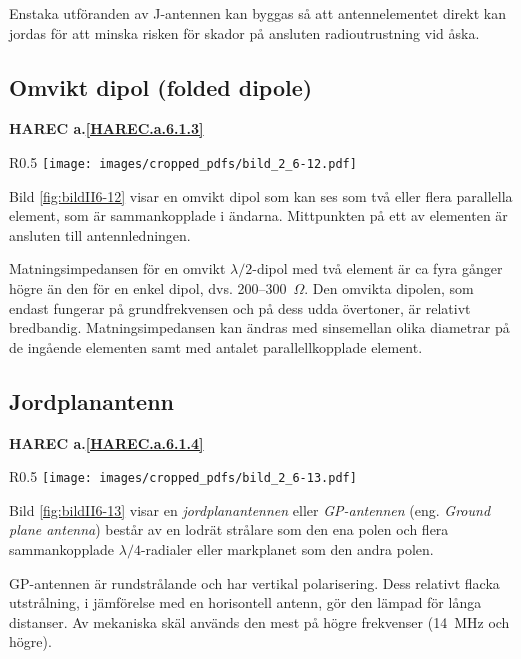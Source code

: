 Enstaka utföranden av J-antennen kan byggas så att antennelementet direkt kan
jordas för att minska risken för skador på ansluten radioutrustning vid åska.

\subsection{Omvikt dipol (folded dipole)}
\textbf{
HAREC a.\ref{HAREC.a.6.1.3}\label{myHAREC.a.6.1.3}
}

\begin{wrapfigure}{R}{0.5\textwidth}
  \texttt{[image: images/cropped\_pdfs/bild\_2\_6-12.pdf]}
  \caption{Omvikt dipol}
  \label{fig:bildII6-12}
\end{wrapfigure}

Bild \ref{fig:bildII6-12} visar en omvikt dipol som kan ses som två eller flera
parallella element, som är sammankopplade i ändarna.
Mittpunkten på ett av elementen är ansluten till antennledningen.

Matningsimpedansen för en omvikt \(\lambda/2\)-dipol med två element är
ca fyra gånger högre än den för en enkel dipol, dvs. 200--300~\(\Omega\).
Den omvikta dipolen, som endast fungerar på grundfrekvensen och på
dess udda övertoner, är relativt bredbandig.
Matningsimpedansen kan ändras med sinsemellan olika diametrar på de ingående
elementen samt med antalet parallellkopplade element.

\subsection{Jordplanantenn}
\textbf{
HAREC a.\ref{HAREC.a.6.1.4}\label{myHAREC.a.6.1.4}
}

\begin{wrapfigure}{R}{0.5\textwidth}
  \texttt{[image: images/cropped\_pdfs/bild\_2\_6-13.pdf]}
  \caption{GP-antenn}
  \label{fig:bildII6-13}
\end{wrapfigure}

Bild \ref{fig:bildII6-13} visar en \emph{jordplanantennen} eller
\emph{GP-antennen} (eng. \emph{Ground plane antenna}) består av en
lodrät strålare som den ena polen och flera sammankopplade
\(\lambda/4\)-radialer eller markplanet som den andra polen.

GP-antennen är rundstrålande och har vertikal polarisering.
Dess relativt flacka utstrålning, i jämförelse med en horisontell antenn,
gör den lämpad för långa distanser.
Av mekaniska skäl används den mest på högre frekvenser (14~MHz och högre).


